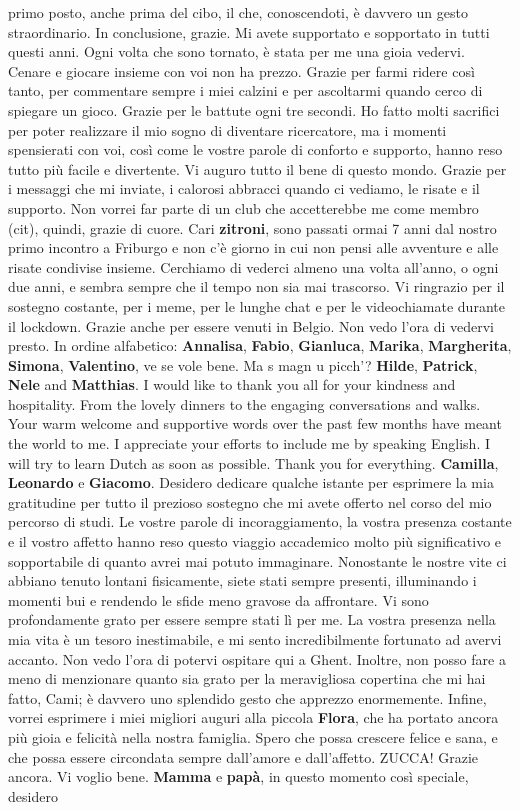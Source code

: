 \documentclass[10pt, twoside]{book} %
\begin{document}
primo posto, anche prima del cibo, il che, conoscendoti, è davvero un gesto straordinario. In conclusione, grazie. Mi avete supportato e sopportato in tutti questi anni. Ogni volta che sono tornato, è stata per me una gioia vedervi. Cenare e giocare insieme con voi non ha prezzo. Grazie per farmi ridere così tanto, per commentare sempre i miei calzini e per ascoltarmi quando cerco di spiegare un gioco. Grazie per le battute ogni tre secondi. Ho fatto molti sacrifici per poter realizzare il mio sogno di diventare ricercatore, ma i momenti spensierati con voi, così come le vostre parole di conforto e supporto, hanno reso tutto più facile e divertente. Vi auguro tutto il bene di questo mondo. Grazie per i messaggi che mi inviate, i calorosi abbracci quando ci vediamo, le risate e il supporto. Non vorrei far parte di un club che accetterebbe me come membro (cit), quindi, grazie di cuore.  Cari \textbf{zitroni}, sono passati ormai 7 anni dal nostro primo incontro a Friburgo e non c'è giorno in cui non pensi alle avventure e alle risate condivise insieme. Cerchiamo di vederci almeno una volta all'anno, o ogni due anni, e sembra sempre che il tempo non sia mai trascorso. Vi ringrazio per il sostegno costante, per i meme, per le lunghe chat e per le videochiamate durante il lockdown. Grazie anche per essere venuti in Belgio. Non vedo l'ora di vedervi presto. In ordine alfabetico: \textbf{Annalisa}, \textbf{Fabio}, \textbf{Gianluca}, \textbf{Marika}, \textbf{Margherita}, \textbf{Simona}, \textbf{Valentino}, ve se vole bene. Ma s magn u picch’? \textbf{Hilde}, \textbf{Patrick}, \textbf{Nele} and \textbf{Matthias}. I would like to thank you all for your kindness and hospitality. From the lovely dinners to the engaging conversations and walks. Your warm welcome and supportive words over the past few months have meant the world to me. I appreciate your efforts to include me by speaking English. I will try to learn Dutch as soon as possible. Thank you for everything. \textbf{Camilla}, \textbf{Leonardo} e \textbf{Giacomo}. Desidero dedicare qualche istante per esprimere la mia  gratitudine per tutto il prezioso sostegno che mi avete offerto nel corso del mio percorso di studi. Le vostre parole di incoraggiamento, la vostra presenza costante e il vostro affetto hanno reso questo viaggio accademico molto più significativo e sopportabile di quanto avrei mai potuto immaginare. Nonostante le nostre vite ci abbiano tenuto lontani fisicamente, siete stati sempre presenti, illuminando i momenti bui e rendendo le sfide meno gravose da affrontare. Vi sono profondamente grato per essere sempre stati lì per me. La vostra presenza nella mia vita è un tesoro inestimabile, e mi sento incredibilmente fortunato ad avervi accanto. Non vedo l'ora di potervi ospitare qui a Ghent. Inoltre, non posso fare a meno di menzionare quanto sia grato per la meravigliosa copertina che mi hai fatto, Cami; è davvero uno splendido gesto che apprezzo enormemente. Infine, vorrei esprimere i miei migliori auguri alla piccola \textbf{Flora}, che ha portato ancora più gioia e felicità nella nostra famiglia. Spero che possa crescere felice e sana, e che possa essere circondata sempre dall'amore e dall'affetto. ZUCCA! Grazie ancora. Vi voglio bene. \textbf{Mamma} e \textbf{papà}, in questo momento così speciale, desidero 
\end{document}

